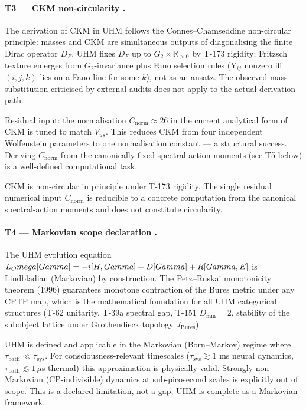 \paragraph{T3 --- CKM non-circularity .}
The derivation of CKM in UHM follows the Connes--Chamseddine non-circular
principle: masses and CKM are simultaneous outputs of diagonalising the finite
Dirac operator $D_F$. UHM fixes $D_F$ up to $G_2 \times \mathbb R_{>0}$ by
T-173 rigidity; Fritzsch texture emerges from $G_2$-invariance plus Fano
selection rules (Y$_{ij}$ nonzero iff $(i,j,k)$ lies on a Fano line for some $k$),
not as an ansatz. The observed-mass substitution criticised by external audits
does not apply to the actual derivation path.

Residual input: the normalisation $C_{\mathrm{norm}} \approx 26$ in the current
analytical form of CKM is tuned to match $V_{us}$. This reduces CKM from four
independent Wolfenstein parameters to one normalisation constant --- a structural
success. Deriving $C_{\mathrm{norm}}$ from the canonically fixed spectral-action
moments (see T5 below) is a well-defined computational task.

\begin{closurebox}
CKM is non-circular in principle under T-173 rigidity. The single residual
numerical input $C_{\mathrm{norm}}$ is reducible to a concrete computation from
the canonical spectral-action moments and does not constitute circularity.
\end{closurebox}

\paragraph{T4 --- Markovian scope declaration .}
The UHM evolution equation $L_Omega[Gamma] = -i[H, Gamma] + D[Gamma]
+ R[Gamma, E]$ is Lindbladian (Markovian) by construction. The Petz--Ruskai
monotonicity theorem (1996) guarantees monotone contraction of the Bures metric
under any CPTP map, which is the mathematical foundation for all UHM categorical
structures (T-62 unitarity, T-39a spectral gap, T-151 $D_{\min} = 2$, stability
of the subobject lattice under Grothendieck topology $J_{\mathrm{Bures}}$).

\begin{closurebox}
UHM is defined and applicable in the Markovian (Born--Markov) regime where
$\tau_{\mathrm{bath}} \ll \tau_{\mathrm{sys}}$. For consciousness-relevant
timescales ($\tau_{\mathrm{sys}} \gtrsim 1$ ms neural dynamics,
$\tau_{\mathrm{bath}} \lesssim 1\,\mu$s thermal) this approximation is
physically valid. Strongly non-Markovian (CP-indivisible) dynamics at
sub-picosecond scales is explicitly out of scope. This is a declared limitation,
not a gap; UHM is complete as a Markovian framework.
\end{closurebox}

